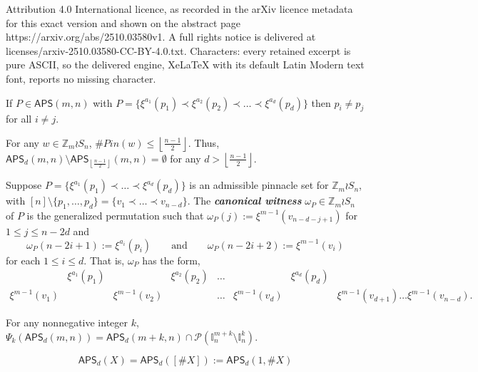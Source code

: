 \documentclass[10pt,a4paper]{amsart}
\newcommand\APS{\mathsf{APS}}
\newcommand{\I}{\mathbb{I}}
\newcommand{\Z}{\mathbb{Z}}
\newcommand{\floor}[1]{\left\lfloor#1\right\rfloor}
\newcommand{\newword}[1]{\emph{\textbf{#1}}}
\begin{document}
Attribution 4.0 International licence, as recorded in the arXiv licence metadata for this exact version and shown on the abstract page https://arxiv.org/abs/2510.03580v1. A full rights notice is delivered at licenses/arxiv-2510.03580-CC-BY-4.0.txt. Characters: every retained excerpt is pure ASCII, so the delivered engine, XeLaTeX with its default Latin Modern text font, reports no missing character.
\begin{lemma} \label{lem: multiplicity} 
    If $P \in \APS(m, n)$ with $P = \{ \xi^{a_1}(p_1) \prec \xi^{a_2}(p_2) \prec \dots \prec \xi^{a_d}(p_d)\}$ then $p_i \neq p_j$ for all $i \neq j$.
\end{lemma}

\begin{lemma} \label{lem:maxLength}
    For any $w \in \Z_m\wr S_n$, $\#Pin(w) \leq \floor{\frac{n-1}{2}}$. Thus, $\APS_d(m, n) \setminus \APS_{\floor{\frac{n-1}{2}}}(m, n) =\emptyset$ for any $d>\floor{\frac{n-1}{2}}$.
\end{lemma}

\begin{definition} \label{def:witness}
Suppose $P = \{ \xi^{a_1}(p_1) \prec \dots \prec \xi^{a_d}(p_d)\}$ is an admissible pinnacle set for $\Z_m \wr S_n$, with $[n]\setminus \{p_1,\dots,p_d\}= \{v_1\prec \dots\prec v_{n-d}\}$. The \newword{canonical witness} $\omega_P \in \Z_m \wr S_n$ of $P$ is the generalized permutation such that $\omega_P(j) := \xi^{m-1}(v_{n-d-j+1})$ for $1\leq j \leq n-2d$ and 
\[
\omega_P(n-2i+1) := \xi^{a_{i}}(p_{i}) 
\qquad \text{and} \qquad 
\omega_P(n-2i+2):= \xi^{m-1}(v_{i})
\]
for each $1\leq i \leq d$. That is, $\omega_P$ has the form, 
\begin{equation*}
\begin{matrix}
    & \xi^{a_1}(p_1) && \xi^{a_2}(p_2) & \dots && \xi^{a_d}(p_d)  
    \\
    \xi^{m-1}(v_{1}) &&\xi^{m-1}(v_{2}) && \dots & \xi^{m-1}(v_{d}) && \xi^{m-1}(v_{d+1}) \dots \xi^{m-1}(v_{n-d}).      
\end{matrix}
\end{equation*}
\end{definition}

\begin{corollary}\label{cor: APSimage}
For any nonnegative integer $k$, 
$\Psi_k(\APS_d(m,n)) =\APS_d(m+k,n) \cap \mathcal{P}(\I_n^{m+k}\setminus \I_n^{k})$. 
\end{corollary}

\begin{equation}\label{eq:APS=set}
\APS_d(X) = \APS_d([\#X]) := \APS_d(1,\#X)
\end{equation}
\end{document}
